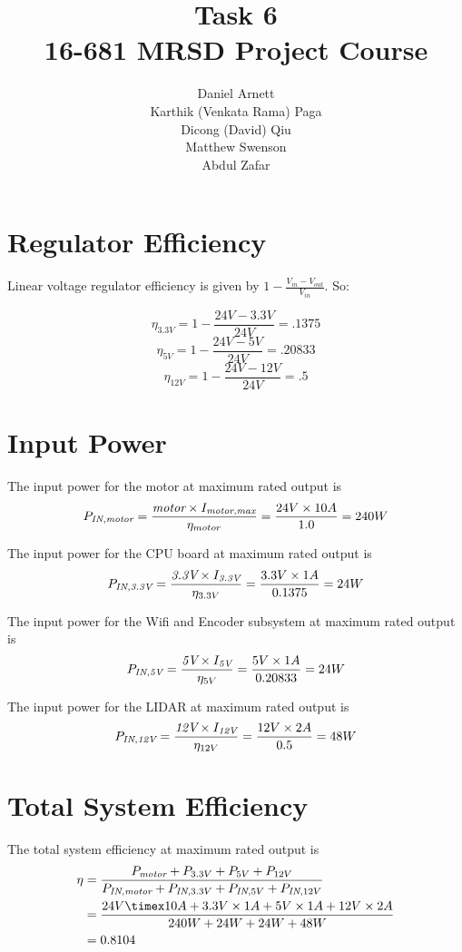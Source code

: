 \documentclass[11pt]{article}
\title{Task 6\\ \vspace{2mm}\Large{16-681 MRSD Project Course }}
\author{
  Daniel Arnett \\
    Karthik (Venkata Rama) Paga\\
  Dicong (David) Qiu\\
  Matthew Swenson\\
  Abdul Zafar
}
\begin{document}
  \maketitle
    \newpage

\section{Regulator Efficiency}
Linear voltage regulator efficiency is given by $1-\frac{V_{in}-V_{out}}{V_{in}}$. 
So: 

$$\eta_{3.3V} = 1-\frac{24V-3.3V}{24V} = .1375$$
$$\eta_{5V} = 1-\frac{24V-5V}{24V} = .20833$$
$$\eta_{12V} = 1-\frac{24V-12V}{24V} = .5$$


\section{Input Power}

The input power for the motor at maximum rated output is 
$$
P_{\textit{IN},\textit{motor}} = \frac{\textit{\textit{motor}} \times I_{\textit{motor}, \textit{max}} }{\eta_{motor}} = \frac{24V \times 10A}{1.0} = 240W
$$

The input power for the CPU board at maximum rated output is 
$$
P_{\textit{IN},\textit{3.3V}} = \frac{\textit{\textit{3.3V}} \times I_{\textit{3.3V}} }{\eta_{3.3V}} = \frac{3.3V \times 1A}{0.1375} = 24W
$$

The input power for the Wifi and Encoder subsystem at maximum rated output is 
$$
P_{\textit{IN},\textit{5V}} = \frac{\textit{\textit{5V}} \times I_{\textit{5V}} }{\eta_{5V}} = \frac{5V \times 1A}{0.20833} = 24W
$$

The input power for the LIDAR at maximum rated output is 
$$
P_{\textit{IN},\textit{12V}} = \frac{\textit{\textit{12V}} \times I_{\textit{12V}} }{\eta_{12V}} = \frac{12V \times 2A}{0.5} = 48W
$$


\section{Total System Efficiency}

The total system efficiency at maximum rated output is 
$$
\begin{align*}
    \eta &= \frac{P_{\textit{motor}} + P_{3.3V} + P_{5V} + P_{12V}}{P_{\textit{IN}, \textit{motor}} + P_{\textit{IN}, 3.3V} + P_{\textit{IN}, 5V} + P_{\textit{IN}, 12V}} \\
    &= \frac{24V \timex 10A + 3.3V \times 1A + 5V \times 1A + 12V \times 2A}{240W + 24W + 24W + 48W} \\
    &= 0.8104
\end{align*}
$$
\end{document}
